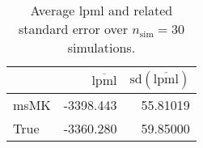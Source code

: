 \begin{table}[H]

\caption{Average lpml and related standard error over $n_{\text{sim}} = 30$ simulations.}
\centering
\begin{tabular}[t]{lrr}
\toprule
  & $\overbar{\text{lpml}}$ & $\text{sd}(\overbar{\text{lpml}})$\\
\midrule
msMK & -3398.443 & 55.81019\\
True & -3360.280 & 59.85000\\
\bottomrule
\end{tabular}
\end{table}